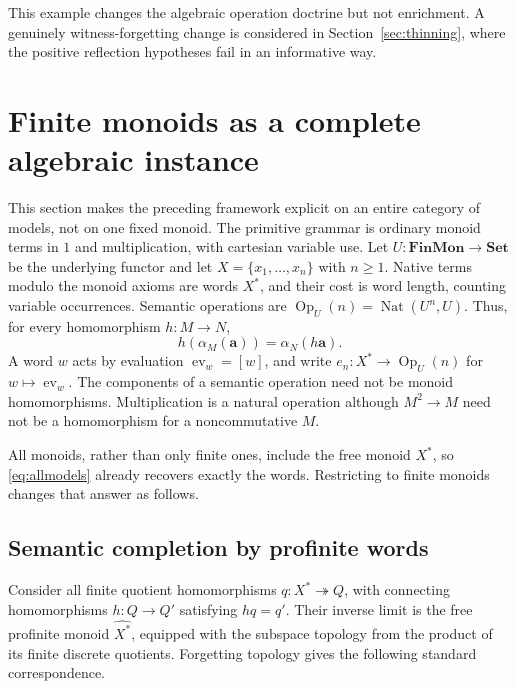 \documentclass[11pt]{article}
\theoremstyle{definition}
\theoremstyle{remark}
\newcommand{\Set}{\mathbf{Set}}
\newcommand{\FinMon}{\mathbf{FinMon}}
\newcommand{\Op}{\operatorname{Op}}
\newcommand{\Nat}{\operatorname{Nat}}
\newcommand{\ev}{\operatorname{ev}}
\begin{document}
This example changes the algebraic operation doctrine but not enrichment.
A genuinely witness-forgetting change is considered in
Section~\ref{sec:thinning}, where the positive reflection hypotheses fail
in an informative way.


\section{Finite monoids as a complete algebraic instance}
\label{sec:monoids}
This section makes the preceding framework explicit on an entire category
of models, not on one fixed monoid. The primitive grammar is ordinary
monoid terms in $1$ and multiplication, with cartesian variable use.
Let $U:\FinMon\to\Set$ be the underlying functor and let
$X=\{x_1,\ldots,x_n\}$ with $n\geq1$. Native terms modulo the monoid
axioms are words $X^*$, and their cost is word length, counting variable
occurrences. Semantic operations are
$\Op_U(n)=\Nat(U^n,U)$. Thus, for every homomorphism $h:M\to N$,
\begin{equation}\label{mon-eq:nat}
 h(\alpha_M(\mathbf a))=\alpha_N(h\mathbf a).
\end{equation}
A word $w$ acts by evaluation $\ev_w=[w]$, and write
$e_n:X^*\to\Op_U(n)$ for $w\mapsto\ev_w$.
The components of a semantic operation need not be monoid homomorphisms.
Multiplication is a natural operation although $M^2\to M$ need not be a
homomorphism for a noncommutative $M$.

All monoids, rather than only finite ones, include the free monoid $X^*$,
so \eqref{eq:allmodels} already recovers exactly the words. Restricting to
finite monoids changes that answer as follows.

\subsection{Semantic completion by profinite words}
\label{mon-sec:profinite}
Consider all finite quotient homomorphisms $q:X^*\twoheadrightarrow Q$,
with connecting homomorphisms $h:Q\to Q'$ satisfying $hq=q'$. Their inverse
limit is the free profinite monoid $\widehat{X^*}$, equipped with the
subspace topology from the product of its finite discrete quotients.
Forgetting topology gives the following standard correspondence.
\end{document}
